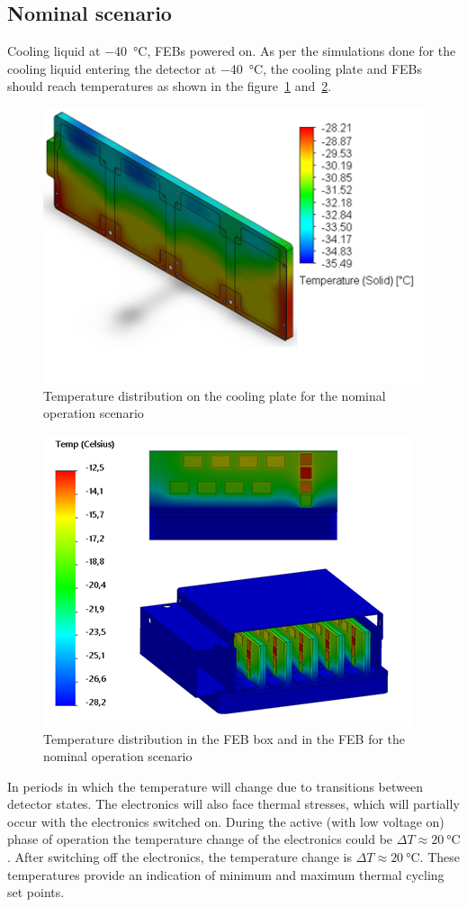 \subsection{Nominal scenario}
Cooling liquid at \SI{-40}{\celsius}, \gls{FEB}s powered on.
    As per the simulations done for the cooling liquid entering the detector at  \SI{-40}{\celsius}, the cooling plate and \gls{FEB}s should reach temperatures as shown in the figure~\ref{fig_coolinkg_block_nominal} and~\ref{fig_nominal_febs}.
\begin{figure}[!h]
\centering
\includegraphics[width=0.6\columnwidth]{Chapter4/images/cooling_block_nominal.png}
\caption{Temperature distribution on the cooling plate for the nominal operation scenario}
\label{fig_coolinkg_block_nominal}
\end{figure}
\begin{figure}[!h]
\centering
\includegraphics[width=0.5\columnwidth]{Chapter4/images/nominal_febs.png}
\caption{Temperature distribution in the \gls{FEB} box and in the \gls{FEB} for the nominal operation scenario}
\label{fig_nominal_febs}
\end{figure}
In periods in which the temperature will change due to transitions between detector states. The electronics will also face thermal stresses, which will partially occur with the electronics switched on. During the active (with low voltage on) phase of operation the temperature change of the electronics could be $\Delta T \approx \SI{20}{\celsius}$. After switching off the electronics, the temperature change is $\Delta T \approx \SI{20}{\celsius}$. These temperatures provide an indication of minimum and maximum thermal cycling set points.  

